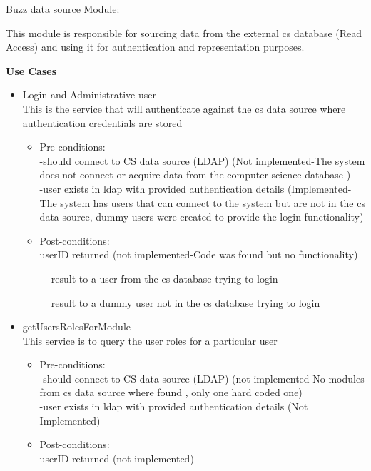 \item Buzz data source Module:

This module is responsible for sourcing data from the external cs database (Read Access) and using it for authentication and representation purposes.


\textbf{Use Cases}
\begin {itemize}


\item {Login and Administrative user}\\
This is the service that will authenticate against the cs data source where authentication credentials are stored

\begin {itemize}
\item Pre-conditions:\\
-should connect to CS data source (LDAP) (Not implemented-The system does not connect or acquire data from the computer science database )\\
        -user exists in ldap with provided authentication details (Implemented-The system has users that can connect to the system but are not in the cs data source, dummy users were created to provide the login functionality)\\
\item Post-conditions:\\
userID returned (not implemented-Code was found but no functionality)  
\end {itemize}

 
\begin{figure}[h!]
  \centering
  \caption{result to a user from the cs database trying to login }
\end{figure}


\begin{figure}[h!]
  \centering
  \caption{result to a dummy user not in the cs database trying to login }
\end{figure}

 
\item {getUsersRolesForModule}\\
This service is to query the user roles for a particular user\\


\begin {itemize}
\item Pre-conditions:\\
-should connect to CS data source (LDAP) (not implemented-No modules from cs data source where found , only one hard coded one)\\
        -user exists in ldap with provided authentication details (Not Implemented)\\
\item Post-conditions:\\
userID returned (not implemented)  
\end {itemize}



\end{itemize}
